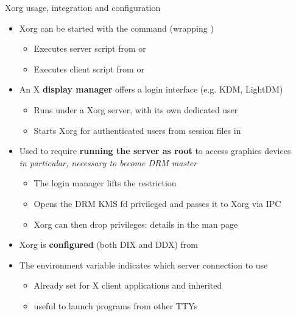 \begin{frame}{Xorg usage, integration and configuration}
  \begin{itemize}
  \item Xorg can be started with the  command (wrapping )
    \begin{itemize}
    \item Executes server script from  or 
    \item Executes client script from  or 
    \end{itemize}
  \item An X \textbf{display manager} offers a login interface (e.g. KDM, LightDM)
    \begin{itemize}
    \item Runs under a Xorg server, with its own dedicated user
    \item Starts Xorg for authenticated users from session files in 
    \end{itemize}
  \item Used to require \textbf{running the server as root} to access graphics devices\\
    \textit{in particular, necessary to become DRM master}
    \begin{itemize}
    \item The  login manager lifts the restriction
    \item Opens the DRM KMS fd privileged and passes it to Xorg via IPC
    \item Xorg can then drop privileges: details in the  man page
    \end{itemize}
  \item Xorg is \textbf{configured} (both DIX and DDX) from 
  \item The  environment variable indicates which server connection to use\\
    \begin{itemize}
    \item Already set for X client applications and inherited
    \item {} useful to launch programs from other TTYs
    \end{itemize}
  \end{itemize}
\end{frame}

